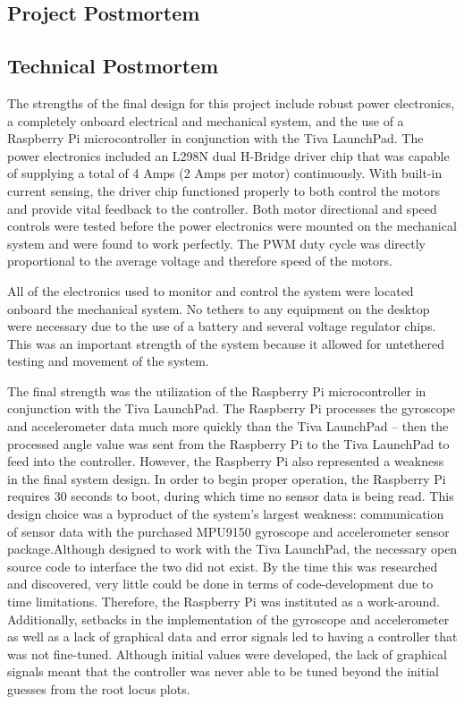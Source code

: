 \documentclass[11pt]{report}
\begin{document}
\begin{spacing}{1.5}
\section*{Project Postmortem}

    \subsection*{Technical Postmortem}
    
    The strengths of the final design for this project include robust power electronics, a completely onboard electrical and mechanical system, and the use of a Raspberry Pi microcontroller in conjunction with the Tiva LaunchPad. The power electronics included an L298N dual H-Bridge driver chip that was capable of supplying a total of 4 Amps (2 Amps per motor) continuously. With built-in current sensing, the driver chip functioned properly to both control the motors and provide vital feedback to the controller. Both motor directional and speed controls were tested before the power electronics were mounted on the mechanical system and were found to work perfectly. The PWM duty cycle was directly proportional to the average voltage and therefore speed of the motors. 
    
    All of the electronics used to monitor and control the system were located onboard the mechanical system. No tethers to any equipment on the desktop were necessary due to the use of a battery and several voltage regulator chips. This was an important strength of the system because it allowed for untethered testing and movement of the system. 
    
    The final strength was the utilization of the Raspberry Pi microcontroller in conjunction with the Tiva LaunchPad. The Raspberry Pi processes the gyroscope and accelerometer data much more quickly than the Tiva LaunchPad – then the processed angle value was sent from the Raspberry Pi to the Tiva LaunchPad to feed into the controller. However, the Raspberry Pi also represented a weakness in the final system design. In order to begin proper operation, the Raspberry Pi requires 30 seconds to boot, during which time no sensor data is being read. This design choice was a byproduct of the system’s largest weakness: communication of sensor data with the purchased MPU9150 gyroscope and accelerometer sensor package.Although designed to work with the Tiva LaunchPad, the necessary open source code to interface the two did not exist. By the time this was researched and discovered, very little could be done in terms of code-development due to time limitations. Therefore, the Raspberry Pi was instituted as a work-around. Additionally, setbacks in the implementation of the gyroscope and accelerometer as well as a lack of graphical data and error signals led to having a controller that was not fine-tuned. Although initial values were developed, the lack of graphical signals meant that the controller was never able to be tuned beyond the initial guesses from the root locus plots. 
    

\end{spacing}
\end{document}
